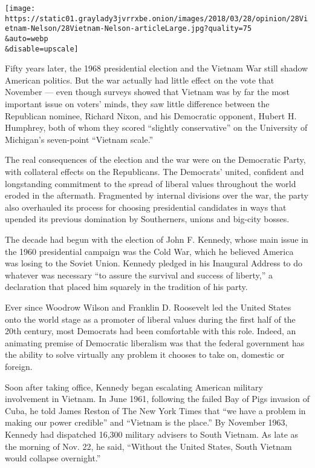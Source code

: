 \texttt{[image: https://static01.graylady3jvrrxbe.onion/images/2018/03/28/opinion/28Vietnam-Nelson/28Vietnam-Nelson-articleLarge.jpg?quality=75\\\&auto=webp\\\&disable=upscale]}

Fifty years later, the 1968 presidential election and the Vietnam War
still shadow American politics. But the war actually had little effect
on the vote that November --- even though surveys showed that Vietnam
was by far the most important issue on voters' minds, they saw little
difference between the Republican nominee, Richard Nixon, and his
Democratic opponent, Hubert H. Humphrey, both of whom they scored
``slightly conservative'' on the University of Michigan's seven-point
``Vietnam scale.''

The real consequences of the election and the war were on the Democratic
Party, with collateral effects on the Republicans. The Democrats'
united, confident and longstanding commitment to the spread of liberal
values throughout the world eroded in the aftermath. Fragmented by
internal divisions over the war, the party also overhauled its process
for choosing presidential candidates in ways that upended its previous
domination by Southerners, unions and big-city bosses.

The decade had begun with the election of John F. Kennedy, whose main
issue in the 1960 presidential campaign was the Cold War, which he
believed America was losing to the Soviet Union. Kennedy pledged in his
Inaugural Address to do whatever was necessary ``to assure the survival
and success of liberty,'' a declaration that placed him squarely in the
tradition of his party.

Ever since Woodrow Wilson and Franklin D. Roosevelt led the United
States onto the world stage as a promoter of liberal values during the
first half of the 20th century, most Democrats had been comfortable with
this role. Indeed, an animating premise of Democratic liberalism was
that the federal government has the ability to solve virtually any
problem it chooses to take on, domestic or foreign.

Soon after taking office, Kennedy began escalating American military
involvement in Vietnam. In June 1961, following the failed Bay of Pigs
invasion of Cuba, he told James Reston of The New York Times that ``we
have a problem in making our power credible'' and ``Vietnam is the
place.'' By November 1963, Kennedy had dispatched 16,300 military
advisers to South Vietnam. As late as the morning of Nov. 22, he said,
``Without the United States, South Vietnam would collapse overnight.''

